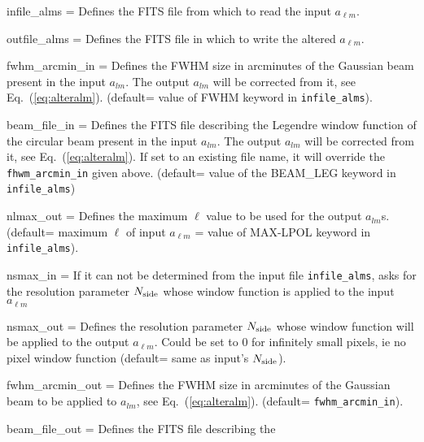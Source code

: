 \begin{qualifiers}
  \begin{qulist}{} %
    \item[{infile\_alms = }]%
 Defines the FITS file from which to read the input
	$a_{\ell m}$.
    \item[{outfile\_alms = }]%
 Defines the FITS file in which to write the altered
	$a_{\ell m}$.
    \item[{fwhm\_arcmin\_in = }]%
 Defines the FWHM size in arcminutes 
      of the Gaussian beam present in the input $a_{lm}$. The output $a_{lm}$ will be
      corrected from it, see Eq.~(\ref{eq:alteralm}). (default= value of FWHM keyword in {\tt infile\_alms}).
    \item[{beam\_file\_in = }]%
 Defines the FITS file describing the
      Legendre window function of the circular beam present in the input $a_{lm}$. The output $a_{lm}$ will be
      corrected from it, see Eq.~(\ref{eq:alteralm}). If set to an existing file name, it will override the
    {\tt fhwm\_arcmin\_in} given above. (default= value of the BEAM\_LEG keyword in {\tt infile\_alms})
     \item[{nlmax\_out = }]%
 Defines the maximum $\ell$ value 
       to be used for the output $a_{lm}$s. (default= maximum $\ell$ of input
       $a_{\ell m}$ = value of MAX-LPOL keyword in {\tt infile\_alms}).
     \item[{nsmax\_in = }]%
 If it can not be determined from the input file {\tt infile\_alms}, asks
       for the \healpix resolution parameter ${N_{\rm side}}$ whose
       window function is applied to the input $a_{\ell m}$
     \item[{nsmax\_out = }]%
 Defines the \healpix resolution parameter ${N_{\rm side}}$ whose
       window function will be applied to the output $a_{\ell m}$. Could be set
       to 0 for infinitely small pixels, ie no pixel window function (default= same as input's ${N_{\rm side}}$).
    \item[{fwhm\_arcmin\_out = }]%
 Defines the FWHM size in arcminutes 
      of the Gaussian beam to be applied to $a_{lm}$, see
      Eq.~(\ref{eq:alteralm}). (default= {\tt fwhm\_arcmin\_in}).
    \item[{beam\_file\_out = }] Defines the FITS file describing the

\end{qulist}
\end{qualifiers}
